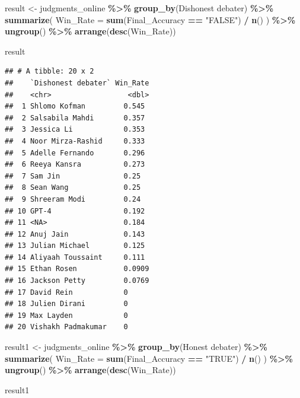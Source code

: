 \documentclass[
]{article}
\newenvironment{Shaded}{\begin{snugshade}}{\end{snugshade}}
\newcommand{\AttributeTok}[1]{\textcolor[rgb]{0.13,0.29,0.53}{#1}}
\newcommand{\FunctionTok}[1]{\textcolor[rgb]{0.13,0.29,0.53}{\textbf{#1}}}
\newcommand{\NormalTok}[1]{#1}
\newcommand{\OtherTok}[1]{\textcolor[rgb]{0.56,0.35,0.01}{#1}}
\newcommand{\SpecialCharTok}[1]{\textcolor[rgb]{0.81,0.36,0.00}{\textbf{#1}}}
\newcommand{\StringTok}[1]{\textcolor[rgb]{0.31,0.60,0.02}{#1}}
\begin{document}
\begin{Shaded}
\begin{Highlighting}[]
\NormalTok{result }\OtherTok{\textless{}{-}}\NormalTok{ judgments\_online }\SpecialCharTok{\%\textgreater{}\%}
  \FunctionTok{group\_by}\NormalTok{(}\StringTok{\textasciigrave{}}\AttributeTok{Dishonest debater}\StringTok{\textasciigrave{}}\NormalTok{) }\SpecialCharTok{\%\textgreater{}\%}
  \FunctionTok{summarize}\NormalTok{(}
    \AttributeTok{Win\_Rate =} \FunctionTok{sum}\NormalTok{(Final\_Accuracy }\SpecialCharTok{==} \StringTok{"FALSE"}\NormalTok{) }\SpecialCharTok{/} \FunctionTok{n}\NormalTok{()}
\NormalTok{  ) }\SpecialCharTok{\%\textgreater{}\%}
  \FunctionTok{ungroup}\NormalTok{() }\SpecialCharTok{\%\textgreater{}\%}
  \FunctionTok{arrange}\NormalTok{(}\FunctionTok{desc}\NormalTok{(Win\_Rate))}

\NormalTok{result}
\end{Highlighting}
\end{Shaded}

\begin{verbatim}
## # A tibble: 20 x 2
##    `Dishonest debater` Win_Rate
##    <chr>                  <dbl>
##  1 Shlomo Kofman         0.545 
##  2 Salsabila Mahdi       0.357 
##  3 Jessica Li            0.353 
##  4 Noor Mirza-Rashid     0.333 
##  5 Adelle Fernando       0.296 
##  6 Reeya Kansra          0.273 
##  7 Sam Jin               0.25  
##  8 Sean Wang             0.25  
##  9 Shreeram Modi         0.24  
## 10 GPT-4                 0.192 
## 11 <NA>                  0.184 
## 12 Anuj Jain             0.143 
## 13 Julian Michael        0.125 
## 14 Aliyaah Toussaint     0.111 
## 15 Ethan Rosen           0.0909
## 16 Jackson Petty         0.0769
## 17 David Rein            0     
## 18 Julien Dirani         0     
## 19 Max Layden            0     
## 20 Vishakh Padmakumar    0
\end{verbatim}

\begin{Shaded}
\begin{Highlighting}[]
\NormalTok{result1 }\OtherTok{\textless{}{-}}\NormalTok{ judgments\_online }\SpecialCharTok{\%\textgreater{}\%}
  \FunctionTok{group\_by}\NormalTok{(}\StringTok{\textasciigrave{}}\AttributeTok{Honest debater}\StringTok{\textasciigrave{}}\NormalTok{) }\SpecialCharTok{\%\textgreater{}\%}
  \FunctionTok{summarize}\NormalTok{(}
    \AttributeTok{Win\_Rate =} \FunctionTok{sum}\NormalTok{(Final\_Accuracy }\SpecialCharTok{==} \StringTok{"TRUE"}\NormalTok{) }\SpecialCharTok{/} \FunctionTok{n}\NormalTok{()}
\NormalTok{  ) }\SpecialCharTok{\%\textgreater{}\%}
  \FunctionTok{ungroup}\NormalTok{() }\SpecialCharTok{\%\textgreater{}\%}
  \FunctionTok{arrange}\NormalTok{(}\FunctionTok{desc}\NormalTok{(Win\_Rate))}

\NormalTok{result1}
\end{Highlighting}
\end{Shaded}
\end{document}
